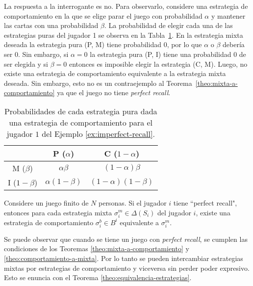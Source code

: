 La respuesta a la interrogante es no. Para observarlo, considere una estrategia de comportamiento en la que se elige parar el juego con probabilidad $\alpha$ y mantener las cartas con una probabilidad $\beta$. La probabilidad de elegir cada una de las estrategias puras del jugador 1 se observa en la Tabla~\ref{table:proba-ep}. En la estrategia mixta deseada la estrategia pura (P, M) tiene probabilidad $0$, por lo que $\alpha$ o $\beta$ debería ser $0$. Sin embargo, si $\alpha = 0$ la estrategia pura (P, I) tiene una probabilidad $0$ de ser elegida y si $\beta = 0$ entonces es imposible elegir la estrategia (C, M). Luego, no existe una estrategia de comportamiento equivalente a la estrategia mixta deseada. Sin embargo, esto no es un contraejemplo al Teorema~\ref{theo:mixta-a-comportamiento} ya que el juego no tiene \textit{perfect recall}.

\begin{table}[h]
\begin{center}
\caption[Probabilidades de las Estrategias Puras]{Probabilidades de cada estrategia pura dada una estrategia de comportamiento para el jugador $1$ del Ejemplo \ref{ex:imperfect-recall}.}
\label{table:proba-ep}
\begin{tabular}{c c c}
\toprule
& P ($\alpha$) & C ($1 - \alpha$) \\ \midrule
M ($\beta$)       & $\alpha\beta$     & $(1-\alpha)\beta$    \\
I ($1-\beta$) & $\alpha(1-\beta)$ & $(1-\alpha)(1-\beta)$\\ \bottomrule
\end{tabular}
\end{center}
\end{table}

\begin{theorem}
\label{theo:mixta-a-comportamiento}
Considere un juego finito de $N$ personas. Si el jugador $i$ tiene ``perfect recall",  entonces para cada estrategia mixta $\sigma^m_i \in \Delta(S_i)$ del jugador $i$, existe una estrategia de comportamiento $\sigma^b_i \in B^i$ equivalente a $\sigma^m_i$.
\end{theorem}


Se puede observar que cuando se tiene un juego con \textit{perfect recall}, se cumplen las condiciones de los Teoremas \ref{theo:mixta-a-comportamiento} y \ref{theo:comportamiento-a-mixta}. Por lo tanto se pueden intercambiar estrategias mixtas por estrategias de comportamiento y viceversa sin perder poder expresivo. Esto se enuncia con el Teorema \ref{theo:equivalencia-estrategias}.

